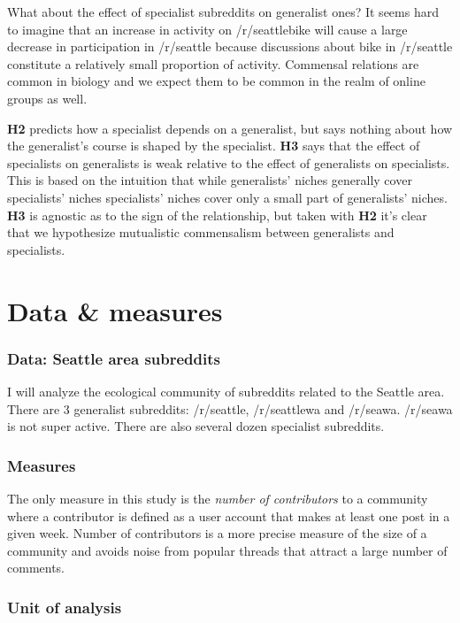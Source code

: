 \documentclass[12pt]{memoir}
\begin{document}
What about the effect of specialist subreddits on generalist ones?  It seems hard to imagine that an increase in activity on /r/seattlebike will cause a large decrease in participation in /r/seattle because discussions about bike in /r/seattle constitute a relatively small proportion of activity.  Commensal relations are common in biology and we expect them to be common in the realm of online groups as well.

\textbf{H2} predicts how a specialist depends on a generalist, but says nothing about how the generalist's course is shaped by the specialist.    \textbf{H3} says that the effect of specialists on generalists is weak relative to the effect of generalists on specialists.  This is based on the intuition that while generalists' niches generally cover specialists' niches specialists' niches cover only a small part of generalists' niches.  \textbf{H3} is agnostic as to the sign of the relationship, but taken with \textbf{H2} it's clear that we hypothesize mutualistic commensalism between generalists and specialists.

\section{Data \& measures}

\subsubsection{Data: Seattle area subreddits}

I will analyze the ecological community of subreddits related to the Seattle area.  There are 3 generalist subreddits: /r/seattle, /r/seattlewa and /r/seawa. /r/seawa is not super active.  There are also several dozen specialist subreddits.

 \subsubsection{Measures}
 The only measure in this study is the \emph{number of contributors} to a community where a contributor is defined as a user account that makes at least one post in a given week. Number of contributors is a more precise measure of the size of a community and avoids noise from popular threads that attract a large number of comments. 

 \subsubsection{Unit of analysis}
 
\end{document}
